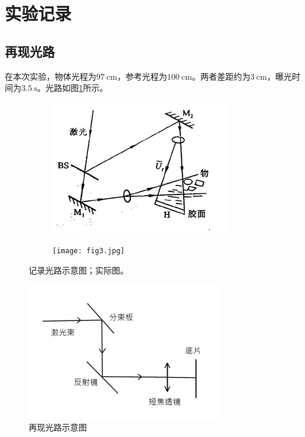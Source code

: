 \documentclass[a4paper]{article}
\begin{document}
\section{实验记录}
\subsection{再现光路}
\hspace{2em} 在本次实验，物体光程为$\SI{97}{\cm}$，参考光程为$\SI{100}{\cm}$。两者差距约为$\SI{3}{\cm}$，曝光时间为$\SI{3.5}{\s}$。光路如图\ref{fig:1}所示。
\par
\begin{figure}[H]
    \centering
    \begin{subfigure}[t]{0.4\textwidth}
        \centering
        \includegraphics[width=\textwidth]{fig1.png}
        \caption{}
        \label{fig:1}
    \end{subfigure}
    \begin{subfigure}[t]{0.4\textwidth}
        \centering
        \texttt{[image: fig3.jpg]}
        \caption{}
        \label{fig:2}
    \end{subfigure}
    \captionsetup{justification=centering,subrefformat=parens}
    \caption{记录光路示意图；实际图。}
\end{figure}

\begin{figure}[H]
    \centering
    \captionsetup{justification=centering,margin=2cm}
    \includegraphics[width=.4\textwidth]{fig2.png}
    \caption{再现光路示意图}
\end{figure}
\end{document}
